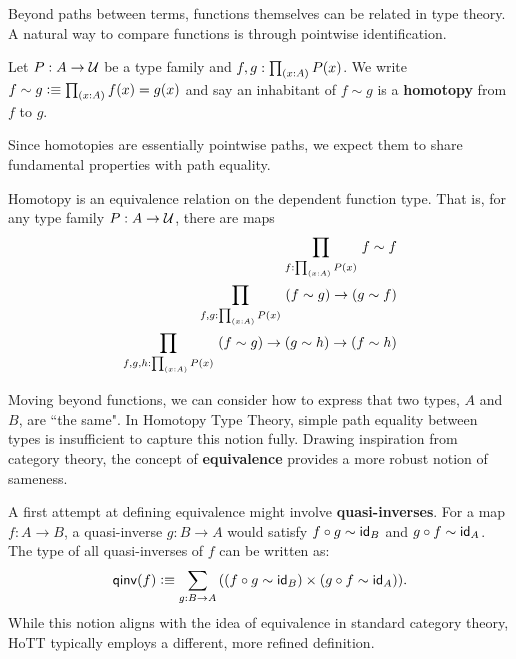 \documentclass[main.tex]{subfiles}
\begin{document}
Beyond paths between terms, functions themselves can be related in type theory. A natural way to compare functions is through pointwise identification.
\begin{definition}
    Let $P : A \to \mathcal{U}$ be a type family and $f,g : \prd{x : A}P(x)$. We write
    $f\sim g \defeq \prd{x : A} f(x) = g(x) $
    and say an inhabitant of $f \sim g$ is a \textbf{homotopy} from $f$ to $g$.
\end{definition}
Since homotopies are essentially pointwise paths, we expect them to share fundamental properties with path equality.

\begin{lemma}
    Homotopy is an equivalence relation on the dependent function type. That is, for any type family $P : A \to \mathcal{U}$, there are maps
    \begin{align*}
        \prd{f : \prd{x : A}P(x)} f \sim f\\
        \prd{f,g : \prd{x:A}P(x)} \left ( f \sim g \right ) \to \left ( g \sim f \right )\\
        \prd{f,g,h : \prd{x : A} P(x)} \left ( f \sim g \right ) \to \left ( g \sim h \right ) \to \left (f \sim h\right )
    \end{align*}
\end{lemma}
Moving beyond functions, we can consider how to express that two types, $A$ and $B$, are ``the same". In Homotopy Type Theory, simple path equality between types is insufficient to capture this notion fully. Drawing inspiration from category theory, the concept of \textbf{equivalence} provides a more robust notion of sameness.

A first attempt at defining equivalence might involve \textbf{quasi-inverses}. For a map $f : A \to B$, a quasi-inverse $g : B \to A$ would satisfy $f\circ g \sim \mathsf{id}_{B}$ and $g \circ f \sim \mathsf{id}_{A}$. The type of all quasi-inverses of $f$ can be written as:
\[
    \qinv(f) \defeq \sm{g : B \to A}((f\circ g \sim \id{B})\times(g \circ f \sim \id{A})).
\]    
While this notion aligns with the idea of equivalence in standard category theory, HoTT typically employs a different, more refined definition.
\end{document}
